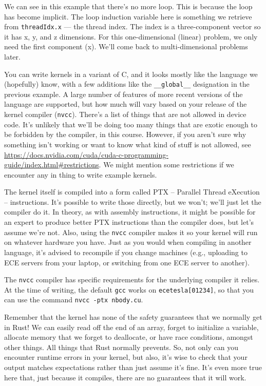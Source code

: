 \documentclass[a4paper]{report}
\newcommand{\CPP}{C\nolinebreak\hspace{-.05em}\raisebox{.4ex}{\tiny\bf +}\nolinebreak\hspace{-.10em}\raisebox{.4ex}{\tiny\bf +}}
\def\CPP{{C\nolinebreak[4]\hspace{-.05em}\raisebox{.4ex}{\tiny\bf ++}}}
\begin{document}
We can see in this example that there's no more loop. This is because the loop has become implicit. The loop induction variable here is something we retrieve from \texttt{threadIdx.x} --- the thread index. The index is a three-component vector so it has x, y, and z dimensions. For this one-dimensional (linear) problem, we only need the first component (x). We'll come back to multi-dimensional problems later.

You can write kernels in a variant of \CPP, and it looks mostly like the language we (hopefully) know, with a few additions like the \texttt{\_\_global\_\_} designation in the previous example. A large number of features of more recent versions of the language are supported, but how much will vary based on your release of the kernel compiler (\texttt{nvcc}). There's a list of things that are not allowed in device code. It's unlikely that we'll be doing too many things that are exotic enough to be forbidden by the compiler, in this course. However, if you aren't sure why something isn't working or want to know what kind of stuff is not allowed, see \url{https://docs.nvidia.com/cuda/cuda-c-programming-guide/index.html#restrictions}. We might mention some restrictions if we encounter any in thing to write example kernels.

The kernel itself is compiled into a form called PTX -- Parallel Thread eXecution -- instructions. It's possible to write those directly, but we won't; we'll just let the compiler do it. In theory, as with assembly instructions, it might be possible for an expert to produce better PTX instructions than the compiler does, but let's assume we're not. Also, using the \texttt{nvcc} compiler makes it so your kernel will run on whatever hardware you have. Just as you would when compiling in another language, it's advised to recompile if you change machines (e.g., uploading to ECE servers from your laptop, or switching from one ECE server to another).

The \texttt{nvcc} compiler has specific requirements for the underlying compiler it relies. At the time of writing, the default \texttt{gcc} works on \texttt{ecetesla[01234]}, so that you can use the command \texttt{nvcc -ptx nbody.cu}.

Remember that the kernel has none of the safety guarantees that we normally get in Rust! We can easily read off the end of an array, forget to initialize a variable, allocate memory that we forget to deallocate, or have race conditions, amongst other things. All things that Rust normally prevents. So, not only can you encounter runtime errors in your kernel, but also, it's wise to check that your output matches expectations rather than just assume it's fine. It's even more true here that, just because it compiles, there are no guarantees that it will work.
\end{document}

